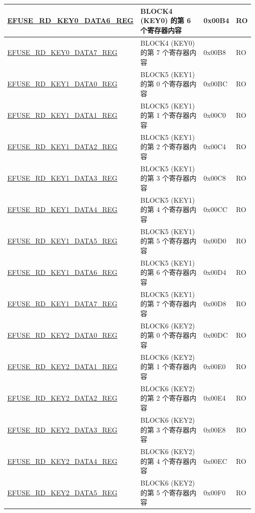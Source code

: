 \begin{longtable}{ | p{6.8cm} | p{7cm} | p{1.3cm} | p{1.2cm} | }
\hyperref[regdesc:EFUSERDKEY0DATA6REG]{EFUSE\_RD\_KEY0\_DATA6\_REG} & BLOCK4 (KEY0) 的第 6 个寄存器内容 & 0x00B4 & RO \\ \hline
\hyperref[regdesc:EFUSERDKEY0DATA7REG]{EFUSE\_RD\_KEY0\_DATA7\_REG} & BLOCK4 (KEY0) 的第 7 个寄存器内容 & 0x00B8 & RO \\ \hline
\hyperref[regdesc:EFUSERDKEY1DATA0REG]{EFUSE\_RD\_KEY1\_DATA0\_REG} & BLOCK5 (KEY1) 的第 0 个寄存器内容 & 0x00BC & RO \\ \hline
\hyperref[regdesc:EFUSERDKEY1DATA1REG]{EFUSE\_RD\_KEY1\_DATA1\_REG} & BLOCK5 (KEY1) 的第 1 个寄存器内容 & 0x00C0 & RO \\ \hline
\hyperref[regdesc:EFUSERDKEY1DATA2REG]{EFUSE\_RD\_KEY1\_DATA2\_REG} & BLOCK5 (KEY1) 的第 2 个寄存器内容 & 0x00C4 & RO \\ \hline
\hyperref[regdesc:EFUSERDKEY1DATA3REG]{EFUSE\_RD\_KEY1\_DATA3\_REG} & BLOCK5 (KEY1) 的第 3 个寄存器内容 & 0x00C8 & RO \\ \hline
\hyperref[regdesc:EFUSERDKEY1DATA4REG]{EFUSE\_RD\_KEY1\_DATA4\_REG} & BLOCK5 (KEY1) 的第 4 个寄存器内容 & 0x00CC & RO \\ \hline
\hyperref[regdesc:EFUSERDKEY1DATA5REG]{EFUSE\_RD\_KEY1\_DATA5\_REG} & BLOCK5 (KEY1) 的第 5 个寄存器内容 & 0x00D0 & RO \\ \hline
\hyperref[regdesc:EFUSERDKEY1DATA6REG]{EFUSE\_RD\_KEY1\_DATA6\_REG} & BLOCK5 (KEY1) 的第 6 个寄存器内容 & 0x00D4 & RO \\ \hline
\hyperref[regdesc:EFUSERDKEY1DATA7REG]{EFUSE\_RD\_KEY1\_DATA7\_REG} & BLOCK5 (KEY1) 的第 7 个寄存器内容 & 0x00D8 & RO \\ \hline
\hyperref[regdesc:EFUSERDKEY2DATA0REG]{EFUSE\_RD\_KEY2\_DATA0\_REG} & BLOCK6 (KEY2) 的第 0 个寄存器内容 & 0x00DC & RO \\ \hline
\hyperref[regdesc:EFUSERDKEY2DATA1REG]{EFUSE\_RD\_KEY2\_DATA1\_REG} & BLOCK6 (KEY2) 的第 1 个寄存器内容 & 0x00E0 & RO \\ \hline
\hyperref[regdesc:EFUSERDKEY2DATA2REG]{EFUSE\_RD\_KEY2\_DATA2\_REG} & BLOCK6 (KEY2) 的第 2 个寄存器内容 & 0x00E4 & RO \\ \hline
\hyperref[regdesc:EFUSERDKEY2DATA3REG]{EFUSE\_RD\_KEY2\_DATA3\_REG} & BLOCK6 (KEY2) 的第 3 个寄存器内容 & 0x00E8 & RO \\ \hline
\hyperref[regdesc:EFUSERDKEY2DATA4REG]{EFUSE\_RD\_KEY2\_DATA4\_REG} & BLOCK6 (KEY2) 的第 4 个寄存器内容 & 0x00EC & RO \\ \hline
\hyperref[regdesc:EFUSERDKEY2DATA5REG]{EFUSE\_RD\_KEY2\_DATA5\_REG} & BLOCK6 (KEY2) 的第 5 个寄存器内容 & 0x00F0 & RO \\ \hline

\end{longtable}
